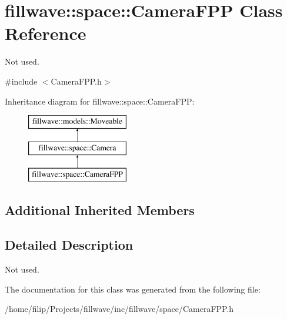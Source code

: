 \hypertarget{classfillwave_1_1space_1_1CameraFPP}{}\section{fillwave\+:\+:space\+:\+:Camera\+F\+P\+P Class Reference}
\label{classfillwave_1_1space_1_1CameraFPP}


Not used.  




{\ttfamily \#include $<$Camera\+F\+P\+P.\+h$>$}

Inheritance diagram for fillwave\+:\+:space\+:\+:Camera\+F\+P\+P\+:\begin{figure}[H]
\begin{center}
\leavevmode
\includegraphics[height=3.000000cm]{classfillwave_1_1space_1_1CameraFPP}
\end{center}
\end{figure}
\subsection*{Additional Inherited Members}


\subsection{Detailed Description}
Not used. 

The documentation for this class was generated from the following file\+:\begin{DoxyCompactItemize}
\item 
/home/filip/\+Projects/fillwave/inc/fillwave/space/Camera\+F\+P\+P.\+h\end{DoxyCompactItemize}

